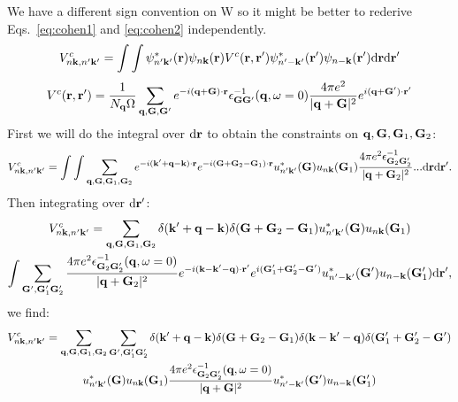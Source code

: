 We have a different sign convention on W so it might be better to rederive
Eqs.~\ref{eq:cohen1} and \ref{eq:cohen2} independently.
%
\begin{equation}
V^{c}_{n{\bf k},n'{\bf k}'} = \int \int \psi^{*}_{n'{\bf k}'}({\bf r})\psi_{n{\bf k}}({\bf r})V^{c}({\bf r},{\bf r}')\psi^{*}_{n'-{\bf k}'}({\bf r}')\psi_{n-{\bf k}}({\bf r}')\rm{d}{\bf r} \rm{d}{\bf r}'
\end{equation}
%
\begin{equation}
V^{c}({\bf r},{\bf r}') = \frac{1}{N_{{\bf q}}\Omega}\sum_{{\bf q},{\bf G},{\bf G}'}e^{-i({\bf q}+{\bf G})\cdot{\bf r}} \epsilon^{-1}_{{\bf G}{\bf G}'}({\bf q},\omega=0)\frac{4\pi e^{2}}{|{\bf q}+{\bf G}|^{2}} e^{i({\bf q}+{\bf G}')\cdot{\bf r}'}
\end{equation}
%
First we will do the integral over $\rm{d}{\bf r}$ to obtain the constraints on ${\bf q},{\bf G},{\bf G}_{1},{\bf G}_{2}$:
%
\begin{equation}
V^{c}_{n{\bf k},n'{\bf k}'} = \int \int \sum_{{\bf q},{\bf G},{\bf G}_{1},{\bf G}_{2}} e^{-i({\bf k}'+{\bf q}-{\bf k})\cdot{\bf r}} e^{-i({\bf G}+{\bf G}_{2}-{\bf G}_{1})\cdot{\bf r}} u^{*}_{n'{\bf k}'}({\bf G}) u_{n{\bf k}}({\bf G}_{1})\\
\frac{4\pi e^{2}\epsilon^{-1}_{{\bf G}_{2}{\bf G}_{2}'}}{|{\bf q}+{\bf G}_{2}|^{2}}...\rm{d}{\bf r}\rm{d}{\bf r}'.
\end{equation}
%
Then integrating over $\rm{d}{\bf r}'$:
%
\begin{multline}
V^{c}_{n{\bf k},n'{\bf k}'} = \sum_{{\bf q},{\bf G},{\bf G}_{1},{\bf G}_{2}} \delta({\bf k}'+{\bf q}-{\bf k}) \delta({\bf G}+{\bf G}_{2}-{\bf G}_{1}) u^{*}_{n'{\bf k}'}({\bf G})u_{n{\bf k}}({\bf G}_{1})\\
\int \sum_{{\bf G}',{\bf G}_{1}'{\bf G}_{2}'} \frac{4\pi e^{2}\epsilon^{-1}_{{\bf G}_{2}{\bf G}_{2}'}({\bf q},\omega=0)}{|{\bf q}+{\bf G}_{2}|^{2}}
e^{-i({\bf k}-{\bf k}'-{\bf q})\cdot{\bf r}'} e^{i({\bf G}_{1}'+{\bf G}_{2}'-{\bf G}')}u^{*}_{n'-{\bf k}'}({\bf G}') u_{n-{\bf k}}({\bf G}_{1}')\rm{d}{\bf r}',
\end{multline}
%
we find:
%
\begin{multline}
V^{c}_{n{\bf k},n'{\bf k}'} = \sum_{{\bf q},{\bf G},{\bf G}_{1},{\bf G}_{2}}\sum_{{\bf G}',{\bf G}_{1}'{\bf G}_{2}'} \delta({\bf k}'+{\bf q}-{\bf k})\delta({\bf G}+{\bf G}_{2}-{\bf G}_{1})\delta({\bf k}-{\bf k}'-{\bf q})\delta({\bf G}_{1}'+{\bf G}_{2}'-{\bf G}')\\ 
u^{*}_{n'{\bf k}'}({\bf G})u_{n{\bf k}}({\bf G}_{1})\frac{4\pi e^{2}\epsilon^{-1}_{{\bf G}_{2}{\bf G}_{2}'}({\bf q},\omega=0)}{|{\bf q}+{\bf G}|^{2}} u^{*}_{n'-{\bf k}'}({\bf G}')u_{n-{\bf k}}({\bf G}_{1}')
\end{multline}

